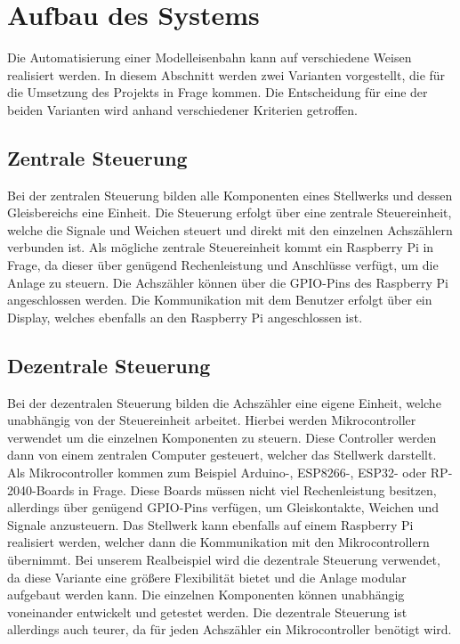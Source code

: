 \section{Aufbau des Systems}\label{text:Methodik:Aufbau-des-Systems}

Die Automatisierung einer Modelleisenbahn kann auf verschiedene Weisen realisiert werden. In diesem Abschnitt werden zwei Varianten vorgestellt, die für die Umsetzung des Projekts in Frage kommen. Die Entscheidung für eine der beiden Varianten wird anhand verschiedener Kriterien getroffen.

\subsection{Zentrale Steuerung}\label{text:Methodik:Aufbau-des-Systems:Zentrale-Steuerung}

Bei der zentralen Steuerung bilden alle Komponenten eines Stellwerks und dessen Gleisbereichs eine Einheit. Die Steuerung erfolgt über eine zentrale Steuereinheit, welche die Signale und Weichen steuert und direkt mit den einzelnen Achszählern verbunden ist. Als mögliche zentrale Steuereinheit kommt ein Raspberry Pi in Frage, da dieser über genügend Rechenleistung und Anschlüsse verfügt, um die Anlage zu steuern. Die Achszähler können über die GPIO-Pins des Raspberry Pi angeschlossen werden. Die Kommunikation mit dem Benutzer erfolgt über ein Display, welches ebenfalls an den Raspberry Pi angeschlossen ist.

\subsection{Dezentrale Steuerung}\label{text:Methodik:Aufbau-des-Systems:Dezentrale-Steuerung}

Bei der dezentralen Steuerung bilden die Achszähler eine eigene Einheit, welche unabhängig von der Steuereinheit arbeitet. Hierbei werden Mikrocontroller verwendet um die einzelnen Komponenten zu steuern. Diese Controller werden dann von einem zentralen Computer gesteuert, welcher das Stellwerk darstellt. Als Mikrocontroller kommen zum Beispiel Arduino-, ESP8266-, ESP32- oder RP-2040-Boards in Frage. Diese Boards müssen nicht viel Rechenleistung besitzen, allerdings über genügend GPIO-Pins verfügen, um Gleiskontakte, Weichen und Signale anzusteuern. Das Stellwerk kann ebenfalls auf einem Raspberry Pi realisiert werden, welcher dann die Kommunikation mit den Mikrocontrollern übernimmt.
\newline
Bei unserem Realbeispiel wird die dezentrale Steuerung verwendet, da diese Variante eine größere Flexibilität bietet und die Anlage modular aufgebaut werden kann. Die einzelnen Komponenten können unabhängig voneinander entwickelt und getestet werden. Die dezentrale Steuerung ist allerdings auch teurer, da für jeden Achszähler ein Mikrocontroller benötigt wird.

